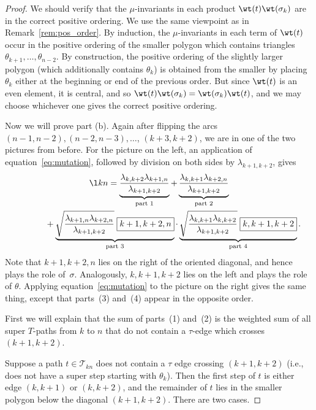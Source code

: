 \begin{proof}
 We should verify that the $\mu$-invariants in each product $\wt(t)\wt(\sigma_k)$ are in the correct positive ordering. {We use the same viewpoint as in Remark~\ref{rem:pos_order}.} By induction, the $\mu$-invariants
 in each term of $\wt(t)$ occur in the positive ordering of the smaller polygon which contains triangles $\theta_{k+1},\dots,\theta_{n-2}$.
 By construction, the positive ordering of the slightly larger polygon (which additionally contains $\theta_k$) is obtained from the smaller by
 placing $\theta_k$ either at the beginning or end of the previous order. But since $\wt(t)$ is an even element, it is central, and so
 $\wt(t)\wt(\sigma_k) = \wt(\sigma_k)\wt(t)$, and we may choose whichever one gives the correct positive ordering.

 Now we will prove part (b). Again after flipping the arcs $(n-1,n-2), (n-2,n-3), \dots$, $(k+3,k+2)$, we are in one of the
 two pictures from before. For the picture on the left, an application of equation~\eqref{eq:mutation}, followed by division on both sides by $\lambda_{k+1,k+2}$, gives
 \begin{gather*}
 \l kn =
 \underbrace{
 \frac{\lambda_{k,k+2} \lambda_{k+1,n}}{\lambda_{k+1,k+2}}}_{\text{part 1}}
 +
 \underbrace{\frac{\lambda_{k,k+1} \lambda_{k+2,n}}{\lambda_{k+1,k+2}}}_{\text{part 2}}\nonumber \\
 \hphantom{\l kn =}{}+
 \underbrace{\sqrt{\frac{\lambda_{k+1,n} \lambda_{k+2,n}}{\lambda_{k+1,k+2}}}\; \boxed{k+1,k+2,n}}_{\text{part 3}}
 \cdot
 \underbrace{\sqrt{\frac{\lambda_{k,k+1} \lambda_{k,k+2}}{\lambda_{k+1,k+2}}}\; \boxed{k,k+1,k+2}}_{\text{part 4}}.%
 \end{gather*}
 Note that $\boxed{k+1,k+2,n}$ lies on the right of the oriented diagonal, and hence plays the role of~$\sigma$. Analogously,
 $\boxed{k,k+1,k+2}$ lies on the left and plays the role of $\theta$. Applying equation~\eqref{eq:mutation} to the picture on the right gives the same thing, except that parts~(3) and~(4) appear
 in the opposite order.

 First we will explain that the sum of parts~(1) and~(2) is the weighted sum of all super $T$-paths from $k$ to $n$
 that do not contain a $\tau$-edge which crosses $(k+1,k+2)$.

 Suppose a path $t \in \mathcal{T}_{kn}$ does not contain a $\tau$ edge crossing $(k+1,k+2)$ (i.e., does not have a super step starting with $\theta_k$).
 Then the first step of $t$ is either edge $(k,k+1)$ or $(k,k+2)$, and the remainder of $t$ lies in the smaller polygon below the diagonal $(k+1,k+2)$.
 There are two cases.


\end{proof}
